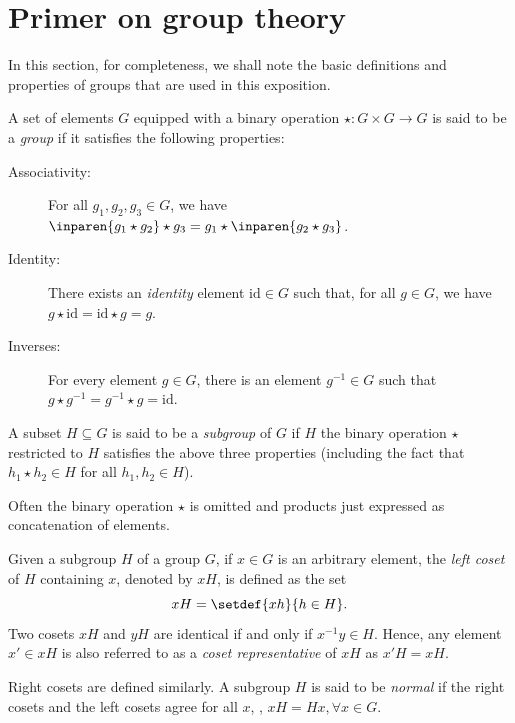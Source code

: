\documentclass{toc}
\begin{document}
\section{Primer on group theory}\label{sec:group}

In this section, for completeness,  we shall note the basic definitions and properties of groups that are used in this exposition. 

\begin{definition}
  A set of elements $G$ equipped with a binary operation $\star: G \times G \rightarrow G$ is said to be a \emph{group} if it satisfies the following properties:
  \begin{description}
  \item[Associativity:] For all $g_1,g_2,g_3 \in G$, we have $\inparen{g_1 \star g_2} \star g_3 = g_1 \star \inparen{g_2 \star g_3}$.
  \item[Identity:] There exists an \emph{identity} element $\mathrm{id} \in G$ such that, for all $g\in G$, we have $g \star \mathrm{id} = \mathrm{id} \star g = g$.
  \item[Inverses:] For every element $g \in G$, there is an element $g^{-1} \in G$ such that $g \star g^{-1} = g^{-1} \star g = \mathrm{id}$. 
  \end{description}
  
  
  A subset $H \subseteq G$ is said to be a \emph{subgroup} of $G$ if
  $H$ the binary operation $\star$ restricted to $H$ satisfies  the
  above three properties (including the fact that $h_1 \star h_2 \in
  H$ for all $h_1,h_2 \in H$).

   \medskip

  Often the binary operation $\star$ is omitted and products just expressed as concatenation of elements.

 
\end{definition}

\begin{definition}[Cosets]
Given a subgroup $H$ of a group $G$, if $x \in G$ is an arbitrary element, the 
%
\emph{left coset}      %
of $H$ containing $x$, denoted by $x H$, is defined as the set
\[
x H = \setdef{x h}{h\in H}.
\]
Two cosets $x H$ and $y H$ are identical if and only if $x^{-1} y \in H$. Hence,
any element $x'\in x H$ is also referred to as a \emph{coset representative} of
$x H$ as $x' H = x H$. 
\end{definition}

%
Right cosets  %
are defined similarly. A subgroup $H$ is said to be
\emph{normal} if the
%
right cosets and the left cosets  %
agree for all $x$,
\ie, $xH = Hx, \forall x \in G$. 
\end{document}
